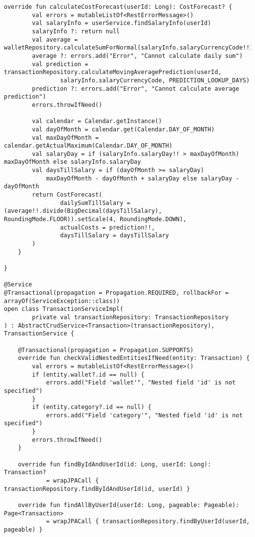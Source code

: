 \begin{lstlisting}[style = ktstyle]
    override fun calculateCostForecast(userId: Long): CostForecast? {
        val errors = mutableListOf<RestErrorMessage>()
        val salaryInfo = userService.findSalaryInfo(userId)
        salaryInfo ?: return null
        val average = walletRepository.calculateSumForNormal(salaryInfo.salaryCurrencyCode!!)
        average ?: errors.add("Error", "Cannot calculate daily sum")
        val prediction = transactionRepository.calculateMovingAveragePrediction(userId,
                salaryInfo.salaryCurrencyCode, PREDICTION_LOOKUP_DAYS)
        prediction ?: errors.add("Error", "Cannot calculate average prediction")
        errors.throwIfNeed()

        val calendar = Calendar.getInstance()
        val dayOfMonth = calendar.get(Calendar.DAY_OF_MONTH)
        val maxDayOfMonth = calendar.getActualMaximum(Calendar.DAY_OF_MONTH)
        val salaryDay = if (salaryInfo.salaryDay!! > maxDayOfMonth) maxDayOfMonth else salaryInfo.salaryDay
        val daysTillSalary = if (dayOfMonth >= salaryDay)
            maxDayOfMonth - dayOfMonth + salaryDay else salaryDay - dayOfMonth
        return CostForecast(
                dailySumTillSalary = (average!!.divide(BigDecimal(daysTillSalary), RoundingMode.FLOOR)).setScale(4, RoundingMode.DOWN),
                actualCosts = prediction!!,
                daysTillSalary = daysTillSalary
        )
    }

}

@Service
@Transactional(propagation = Propagation.REQUIRED, rollbackFor = arrayOf(ServiceException::class))
open class TransactionServiceImpl(
        private val transactionRepository: TransactionRepository
) : AbstractCrudService<Transaction>(transactionRepository), TransactionService {

    @Transactional(propagation = Propagation.SUPPORTS)
    override fun checkValidNestedEntitiesIfNeed(entity: Transaction) {
        val errors = mutableListOf<RestErrorMessage>()
        if (entity.wallet?.id == null) {
            errors.add("Field 'wallet'", "Nested field 'id' is not specified")
        }
        if (entity.category?.id == null) {
            errors.add("Field 'category'", "Nested field 'id' is not specified")
        }
        errors.throwIfNeed()
    }

    override fun findByIdAndUserId(id: Long, userId: Long): Transaction?
            = wrapJPACall { transactionRepository.findByIdAndUserId(id, userId) }

    override fun findAllByUserId(userId: Long, pageable: Pageable): Page<Transaction>
            = wrapJPACall { transactionRepository.findByUserId(userId, pageable) }


\end{lstlisting}
